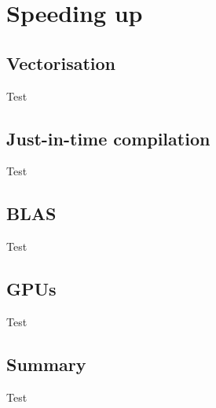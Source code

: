 \documentclass[compress]{beamer}
\begin{document}
\section[Faster]{Speeding up}
\subsection[Vec]{Vectorisation}
\begin{frame}Test\end{frame}
\subsection[Ra]{Just-in-time compilation}
\begin{frame}Test\end{frame}
\subsection{BLAS}
\begin{frame}Test\end{frame}
\subsection{GPUs}
\begin{frame}Test\end{frame}
\subsection{Summary}
\begin{frame}Test\end{frame}
\end{document}
